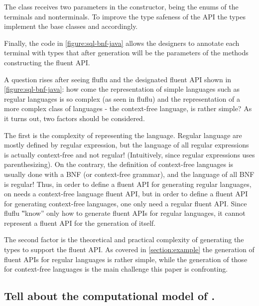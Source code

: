 \begin{quote}
\end{quote}


The  class receives two parameters in the constructor, being the enums
  of the terminals and nonterminals.
To improve the type safeness of the API the types implement the base classes
   and  accordingly.

Finally, the code in \cref{figure:sql-bnf-java} allows the designers to annotate
  each terminal with types that after generation will be the parameters of the
  methods constructing the fluent API.

A question rises after seeing fluflu and the designated fluent API shown in
  \cref{figure:sql-bnf-java}: how come the representation of simple languages
  such as regular languages is so complex (as seen in fluflu) and the representation
  of a more complex class of languages - the context-free language, is rather simple?
As it turns out, two factors should be considered.

The first is the complexity of representing the language.
Regular language are mostly defined by regular expression, but the language of
  all regular expressions is actually context-free and not regular!
  (Intuitively, since regular expressions uses parenthesizing). On the contrary,
  the definition of context-free languages is usually done with a BNF (or
  context-free grammar), and the language of all BNF is regular!
Thus, in order to define a fluent API for generating regular languages, on needs a
  context-free language fluent API, but in order to define a fluent API for
  generating context-free languages, one only need a regular fluent API.
Since fluflu ‟know” only how to generate fluent APIs for regular languages,
  it cannot represent a fluent API for the generation of itself.

The second factor is the theoretical and practical complexity of generating the
  \Java types to support the fluent API. As covered in \cref{section:example}
  the generation of fluent APIs for regular languages is rather simple, while
  the generation of those for context-free languages is the main challenge this
  paper is confronting.

\subsection{Tell about the computational model of \CC.}

